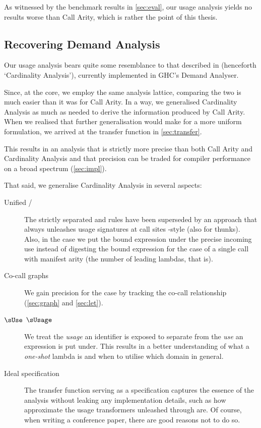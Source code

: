 As witnessed by the benchmark results in \cref{sec:eval}, our usage analysis yields no results worse than Call Arity, which is rather the point of this thesis.

\subsection{Recovering Demand Analysis}

Our usage analysis bears quite some resemblance to that described in \textcite{card} (henceforth `Cardinality Analysis'), currently implemented in GHC's Demand Analyser.

Since, at the core, we employ the same analysis lattice, comparing the two is much easier than it was for Call Arity.
In a way, we generalised Cardinality Analysis as much as needed to derive the information produced by Call Arity.
When we realised that further generalisation would make for a more uniform formulation, we arrived at the transfer function in \cref{sec:transfer}.

This results in an analysis that is strictly more precise than both Call Arity and Cardinality Analysis and that precision can be traded for compiler performance on a broad spectrum (\cf \cref{sec:impl}).

That said, we generalise Cardinality Analysis in several aspects:

\begin{description}
  \item[Unified /] The strictly separated  and  rules have been superseded by an approach that always unleashes usage signatures at call sites -style (also for thunks). Also, in the  case we put the bound expression under the precise incoming use instead of digesting the bound expression for the case of a single call with manifest arity (the number of leading lambdas, that is).
  \item[Co-call graphs] We gain precision for the  case by tracking the co-call relationship (\cf \cref{sec:graph} and \cref{sec:let}).
  \item[$\sUse$ \vs $\sUsage$] We treat the \emph{usage} an identifier is exposed to separate from the \emph{use} an expression is put under. This results in a better understanding of what a \emph{one-shot} lambda is and when to utilise which domain in general.
  \item[Ideal specification] The transfer function serving as a specification captures the essence of the analysis without leaking any implementation details, such as how approximate the usage transformers unleashed through  are. Of course, when writing a conference paper, there are good reasons not to do so.
\end{description}


